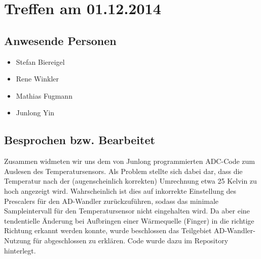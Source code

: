\chapter{Treffen am 01.12.2014}
\section{Anwesende Personen}
\begin{itemize}
	\item Stefan Biereigel
	\item Rene Winkler
	\item Mathias Fugmann
	\item Junlong Yin
\end{itemize}

\section{Besprochen bzw. Bearbeitet}
Zusammen widmeten wir uns dem von Junlong programmierten ADC-Code zum Auslesen des Temperatursensors. Als Problem stellte sich dabei dar, dass die Temperatur nach der (augenscheinlich korrekten) Umrechnung etwa 25 Kelvin zu hoch angezeigt wird. Wahrscheinlich ist dies auf inkorrekte Einstellung des Prescalers für den AD-Wandler zurückzuführen, sodass das minimale Sampleintervall für den Temperatursensor nicht eingehalten wird.
Da aber eine tendentielle Änderung bei Aufbringen einer Wärmequelle (Finger) in die richtige Richtung erkannt werden konnte, wurde beschlossen das Teilgebiet AD-Wandler-Nutzung für abgeschlossen zu erklären. Code wurde dazu im Repository hinterlegt. 